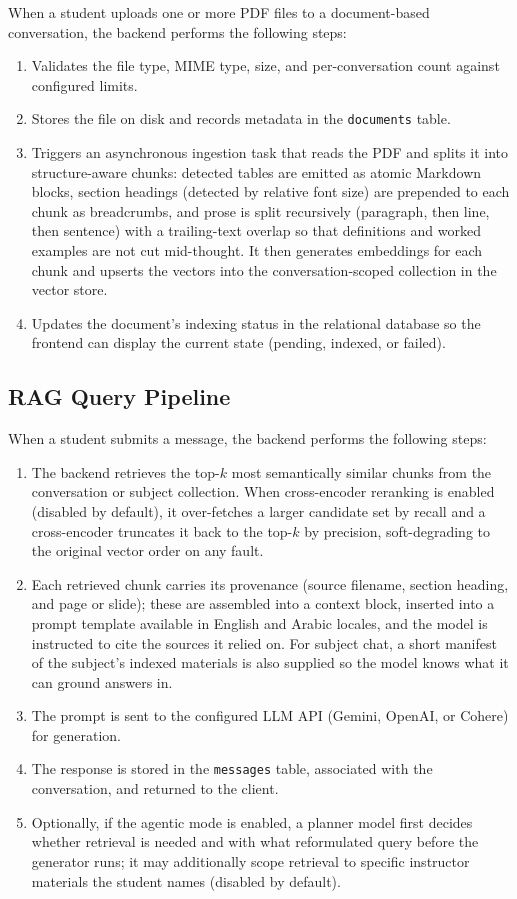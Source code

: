 \documentclass[12pt, a4paper, oneside]{report}
\let\oldsubsection\subsection
\renewcommand{\subsection}{%
  \addtocontents{toc}{\protect\needspace{3\baselineskip}}%
  \oldsubsection
}
\begin{document}
When a student uploads one or more PDF files to a document-based conversation, the backend performs the following steps:
\begin{enumerate}
  \item Validates the file type, MIME type, size, and per-conversation count against configured limits.
  \item Stores the file on disk and records metadata in the \texttt{documents} table.
  \item Triggers an asynchronous ingestion task that reads the PDF and splits it into structure-aware chunks: detected tables are emitted as atomic Markdown blocks, section headings (detected by relative font size) are prepended to each chunk as breadcrumbs, and prose is split recursively (paragraph, then line, then sentence) with a trailing-text overlap so that definitions and worked examples are not cut mid-thought. It then generates embeddings for each chunk and upserts the vectors into the conversation-scoped collection in the vector store.
  \item Updates the document's indexing status in the relational database so the frontend can display the current state (pending, indexed, or failed).
\end{enumerate}

\newpage

\subsection{RAG Query Pipeline}

When a student submits a message, the backend performs the following steps:
\begin{enumerate}
  \item The backend retrieves the top-$k$ most semantically similar chunks from the conversation or subject collection. When cross-encoder reranking is enabled (disabled by default), it over-fetches a larger candidate set by recall and a cross-encoder truncates it back to the top-$k$ by precision, soft-degrading to the original vector order on any fault.
  \item Each retrieved chunk carries its provenance (source filename, section heading, and page or slide); these are assembled into a context block, inserted into a prompt template available in English and Arabic locales, and the model is instructed to cite the sources it relied on. For subject chat, a short manifest of the subject's indexed materials is also supplied so the model knows what it can ground answers in.
  \item The prompt is sent to the configured LLM API (Gemini, OpenAI, or Cohere) for generation.
  \item The response is stored in the \texttt{messages} table, associated with the conversation, and returned to the client.
  \item Optionally, if the agentic mode is enabled, a planner model first decides whether retrieval is needed and with what reformulated query before the generator runs; it may additionally scope retrieval to specific instructor materials the student names (disabled by default).
\end{enumerate}
\end{document}

